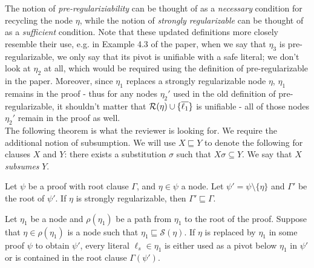 \documentclass{llncs}
\begin{document}
\noindent
The notion of \emph{pre-regulariziability} can be thought of as a \emph{necessary} condition for recycling the node $\eta$, while the notion of \emph{strongly regularizable} can be thought of as a \emph{sufficient} condition. Note that these updated definitions more closely resemble their use, e.g. in Example 4.3 of the paper, when we say that $\eta_3$ is pre-regularizable, we only say that its pivot is unifiable with a safe literal; we don't look at $\eta_2$ at all, which would be required using the definition of pre-regularizable in the paper. Moreover, since $\eta_1$ replaces a strongly regularizable node $\eta$, $\eta_1$ remains in the proof - thus for any nodes $\eta_2'$ used in the old definition of pre-regularizable, it shouldn't matter that $\mathcal{R}(\eta)\cup\{\overline{\ell_1}\}$ is unifiable - all of those nodes $\eta_2'$ remain in the proof as well. \\

\noindent
The following theorem is what the reviewer is looking for. We require the additional notion of subsumption. We will use $X \sqsubseteq Y$ to denote the following for clauses $X$ and $Y$: there exists a substitution $\sigma$ such that $X\sigma \subseteq Y$. We say that $X$ \emph{subsumes} $Y$.



\begin{theorem}\label{thm:correct}
Let $\psi$ be a proof with root clause $\Gamma$, and $\eta\in \psi$ a node. Let $\psi' = \psi\setminus \{\eta\}$ and $\Gamma'$ be the root of $\psi'$. If $\eta$ is strongly regularizable, then $\Gamma' \sqsubseteq \Gamma$. %
\end{theorem}

\begin{lemma}\label{lem:cor}
Let $\eta_1$ be a node and $\rho(\eta_1)$ be a path from $\eta_1$ to the root of the proof. Suppose that $\eta \in \rho(\eta_1)$ is a node such that $\eta_1 \sqsubseteq \mathcal{S}(\eta)$. If $\eta$ is replaced by $\eta_1$ in some proof $\psi$ to obtain $\psi'$, every literal $\ell_s \in \eta_1$ is either used as a pivot below $\eta_1$ in $\psi'$ or is contained in the root clause $\Gamma(\psi')$. \\
\end{lemma}
\end{document}
